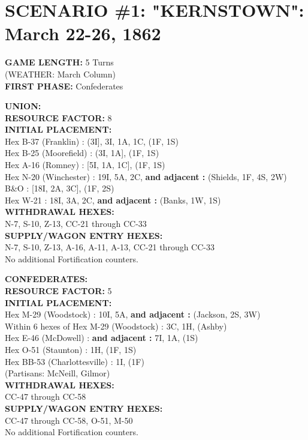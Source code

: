 \section{SCENARIO \#1: "KERNSTOWN": March 22-26, 1862
}

\begin{scenariodata}
\textbf{GAME LENGTH:} 5 Turns\\
(WEATHER: March Column)\\
\textbf{FIRST PHASE:} Confederates
\end{scenariodata}

\begin{uniondata}
\textbf{UNION:}\\
\textbf{RESOURCE FACTOR:} 8\\
\textbf{INITIAL PLACEMENT:}\\
Hex B-37 (Franklin) : (3I], 3I, 1A, 1C, (1F, 1S)\\
Hex B-25 (Moorefield) : (3I, 1A], (1F, 1S)\\
Hex A-16 (Romney) : [5I, 1A, 1C], (1F, 1S)\\
Hex N-20 (Winchester) : 19I, 5A, 2C, \textbf{and adjacent :} (Shields, 1F,
4S, 2W)\\
B\&O : [18I, 2A, 3C], (1F, 2S)\\
Hex W-21 : 18I, 3A, 2C, \textbf{and adjacent :} (Banks, 1W, 1S)\\
\textbf{WITHDRAWAL HEXES:}\\
N-7, S-10, Z-13, CC-21 through CC-33\\
\textbf{SUPPLY/WAGON ENTRY HEXES:}\\
N-7, S-10, Z-13, A-16, A-11, A-13, CC-21 through CC-33\\
No additional Fortification counters.
\end{uniondata}

\begin{confeddata}
\textbf{CONFEDERATES:}\\
\textbf{RESOURCE FACTOR:} 5\\
\textbf{INITIAL PLACEMENT:}\\
Hex M-29 (Woodstock) : 10I, 5A, \textbf{and adjacent :} (Jackson, 2S, 3W)\\
Within 6 hexes of Hex M-29 (Woodstock) : 3C, 1H, (Ashby)\\
Hex E-46 (McDowell) : \textbf{and adjacent :} 7I, 1A, (1S)\\
Hex O-51 (Staunton) : 1H, (1F, 1S)\\
Hex BB-53 (Charlottesville) : 1I, (1F)\\
(Partisans: McNeill, Gilmor)\\
\textbf{WITHDRAWAL HEXES:}\\
CC-47 through CC-58\\
\textbf{SUPPLY/WAGON ENTRY HEXES:}\\
CC-47 through CC-58, O-51, M-50\\
No additional Fortification counters.
\end{confeddata}

